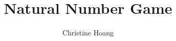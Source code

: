 \documentclass{article}
\title{Natural Number Game}
\author{Christine Hoang}
\begin{document}
\maketitle

\section{}
\end{document}
